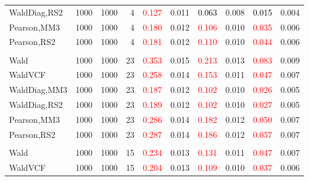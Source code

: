 \documentclass[
]{article}
\begin{document}
\begin{table}[H]
{\begin{tabular}[t]{lrrrrrrlrr}
\hspace{1em}WaldDiag,RS2 & 1000 & 1000 & 4 & \textcolor{red}{0.127} & 0.011 & \textcolor{black}{0.063} & 0.008 & \textcolor{black}{0.015} & 0.004\\
\hspace{1em}Pearson,MM3 & 1000 & 1000 & 4 & \textcolor{red}{0.180} & 0.012 & \textcolor{red}{0.106} & 0.010 & \textcolor{red}{0.035} & 0.006\\
\hspace{1em}Pearson,RS2 & 1000 & 1000 & 4 & \textcolor{red}{0.181} & 0.012 & \textcolor{red}{0.110} & 0.010 & \textcolor{red}{0.044} & 0.006\\
\addlinespace[0.3em]
\multicolumn{10}{l}{\textbf{1F 15V}}\\
\hspace{1em}Wald & 1000 & 1000 & 23 & \textcolor{red}{0.353} & 0.015 & \textcolor{red}{0.213} & 0.013 & \textcolor{red}{0.083} & 0.009\\
\hspace{1em}WaldVCF & 1000 & 1000 & 23 & \textcolor{red}{0.258} & 0.014 & \textcolor{red}{0.153} & 0.011 & \textcolor{red}{0.047} & 0.007\\
\hspace{1em}WaldDiag,MM3 & 1000 & 1000 & 23 & \textcolor{red}{0.187} & 0.012 & \textcolor{red}{0.102} & 0.010 & \textcolor{red}{0.026} & 0.005\\
\hspace{1em}WaldDiag,RS2 & 1000 & 1000 & 23 & \textcolor{red}{0.189} & 0.012 & \textcolor{red}{0.102} & 0.010 & \textcolor{red}{0.027} & 0.005\\
\hspace{1em}Pearson,MM3 & 1000 & 1000 & 23 & \textcolor{red}{0.286} & 0.014 & \textcolor{red}{0.182} & 0.012 & \textcolor{red}{0.050} & 0.007\\
\hspace{1em}Pearson,RS2 & 1000 & 1000 & 23 & \textcolor{red}{0.287} & 0.014 & \textcolor{red}{0.186} & 0.012 & \textcolor{red}{0.057} & 0.007\\
\addlinespace[0.3em]
\multicolumn{10}{l}{\textbf{2F 10V}}\\
\hspace{1em}Wald & 1000 & 1000 & 15 & \textcolor{red}{0.234} & 0.013 & \textcolor{red}{0.131} & 0.011 & \textcolor{red}{0.047} & 0.007\\
\hspace{1em}WaldVCF & 1000 & 1000 & 15 & \textcolor{red}{0.204} & 0.013 & \textcolor{red}{0.109} & 0.010 & \textcolor{red}{0.037} & 0.006\\

\end{tabular}}
\end{table}
\end{document}
